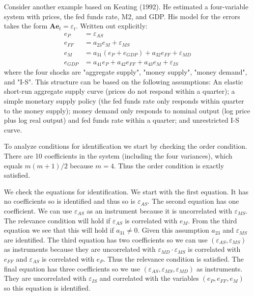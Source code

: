 \documentclass[10pt]{article}
\begin{document}
Consider another example based on Keating (1992). He estimated a four-variable system with prices, the fed funds rate, M2, and GDP. His model for the errors takes the form $\boldsymbol{A} \boldsymbol{e}_{t}=\varepsilon_{t}$. Written out explicitly:
$$
\begin{aligned}
e_{P} &=\varepsilon_{A S} \\
e_{F F} &=a_{23} e_{M}+\varepsilon_{M S} \\
e_{M} &=a_{31}\left(e_{P}+e_{G D P}\right)+a_{32} e_{F F}+\varepsilon_{M D} \\
e_{G D P} &=a_{41} e_{P}+a_{42} e_{F F}+a_{43} e_{M}+\varepsilon_{I S}
\end{aligned}
$$
where the four shocks are "aggregate supply", "money supply", "money demand", and "I-S". This structure can be based on the following assumptions: An elastic short-run aggregate supply curve (prices do not respond within a quarter); a simple monetary supply policy (the fed funds rate only responds within quarter to the money supply); money demand only responds to nominal output (log price plus log real output) and fed funds rate within a quarter; and unrestricted I-S curve.

To analyze conditions for identification we start by checking the order condition. There are 10 coefficients in the system (including the four variances), which equals $m(m+1) / 2$ because $m=4$. Thus the order condition is exactly satisfied.

We check the equations for identification. We start with the first equation. It has no coefficients so is identified and thus so is $\varepsilon_{A S}$. The second equation has one coefficient. We can use $\varepsilon_{A S}$ as an instrument because it is uncorrelated with $\varepsilon_{M S}$. The relevance condition will hold if $\varepsilon_{A S}$ is correlated with $e_{M}$. From the third equation we see that this will hold if $a_{31} \neq 0$. Given this assumption $a_{23}$ and $\varepsilon_{M S}$ are identified. The third equation has two coefficients so we can use $\left(\varepsilon_{A S}, \varepsilon_{M S}\right)$ as instruments because they are uncorrelated with $\varepsilon_{M D} \cdot \varepsilon_{M S}$ is correlated with $e_{F F}$ and $\varepsilon_{A S}$ is correlated with $e_{P}$. Thus the relevance condition is satisfied. The final equation has three coefficients so we use $\left(\varepsilon_{A S}, \varepsilon_{M S}, \varepsilon_{M D}\right)$ as instruments. They are uncorrelated with $\varepsilon_{I S}$ and correlated with the variables $\left(e_{P}, e_{F F}, e_{M}\right)$ so this equation is identified.
\end{document}
